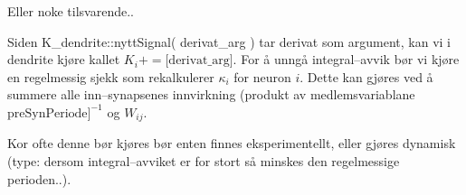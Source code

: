Eller noke tilsvarende.. 

Siden K\_dendrite::nyttSignal( derivat\_arg ) tar derivat som argument, kan vi i dendrite kjøre kallet $K_i += \text{[derivat\_arg]}$. 
For å unngå integral--avvik bør vi kjøre en regelmessig sjekk som rekalkulerer $\kappa_i$ for neuron $i$.
Dette kan gjøres ved å summere alle inn--synapsenes innvirkning (produkt av medlemsvariablane $\text{preSynPeriode]}^{-1}$ og $W_{ij}$.

Kor ofte denne bør kjøres bør enten finnes eksperimentellt, eller gjøres dynamisk (type: dersom integral--avviket er for stort så minskes den regelmessige perioden..).
